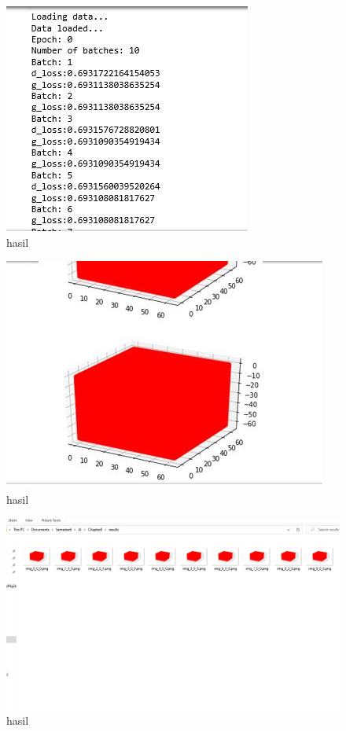\begin{enumerate}
\begin{figure}[ht]
\centering
\includegraphics[scale=0.4]{figures/1174042/chapter8/h1.JPG}
\caption{hasil}
\label{Contoh}
\end{figure}

\begin{figure}[ht]
\centering
\includegraphics[scale=0.4]{figures/1174042/chapter8/h2.JPG}
\caption{hasil}
\label{Contoh}
\end{figure}

\begin{figure}[ht]
\centering
\includegraphics[scale=0.4]{figures/1174042/chapter8/h3.JPG}
\caption{hasil}
\label{Contoh}
\end{figure}


\end{enumerate}
